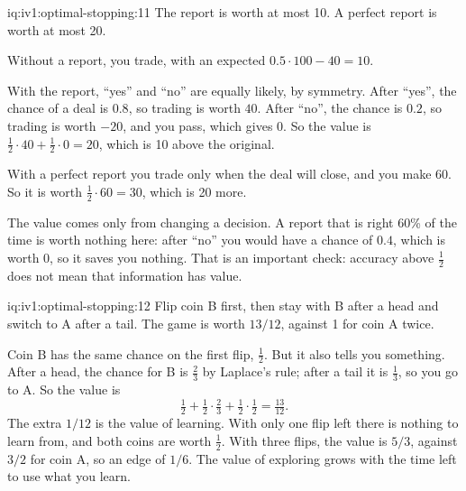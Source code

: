 \begin{solution}{iq:iv1:optimal-stopping:11}
The report is worth at most 10. A perfect report is worth at most 20.

Without a report, you trade, with an expected $0.5 \cdot 100 - 40 = 10$.

With the report, ``yes'' and ``no'' are equally likely, by symmetry. After ``yes'', the chance of a deal is $0.8$, so trading is worth $40$. After ``no'', the chance is $0.2$, so trading is worth $-20$, and you pass, which gives 0. So the value is $\tfrac12 \cdot 40 + \tfrac12 \cdot 0 = 20$, which is 10 above the original.

With a perfect report you trade only when the deal will close, and you make 60. So it is worth $\tfrac12 \cdot 60 = 30$, which is 20 more.

The value comes only from changing a decision. A report that is right 60\% of the time is worth nothing here: after ``no'' you would have a chance of $0.4$, which is worth 0, so it saves you nothing. That is an important check: accuracy above $\tfrac12$ does not mean that information has value.

\end{solution}

\begin{solution}{iq:iv1:optimal-stopping:12}
Flip coin B first, then stay with B after a head and switch to A after a tail. The game is worth $13/12$, against 1 for coin A twice.

Coin B has the same chance on the first flip, $\tfrac12$. But it also tells you something. After a head, the chance for B is $\tfrac23$ by Laplace's rule; after a tail it is $\tfrac13$, so you go to A. So the value is
\[
\tfrac12 + \tfrac12 \cdot \tfrac23 + \tfrac12 \cdot \tfrac12 = \tfrac{13}{12}.
\]
The extra $1/12$ is the value of learning. With only one flip left there is nothing to learn from, and both coins are worth $\tfrac12$. With three flips, the value is $5/3$, against $3/2$ for coin A, so an edge of $1/6$. The value of exploring grows with the time left to use what you learn.

\end{solution}

